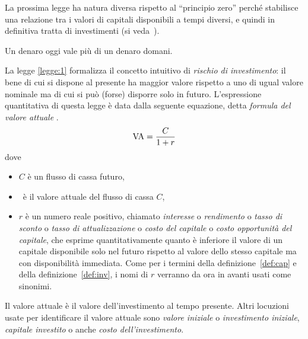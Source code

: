 La prossima legge ha natura diversa rispetto al ``principio zero'' perché stabilisce una relazione tra i valori di capitali
disponibili a tempi diversi, e quindi in definitiva tratta di investimenti (si veda~\cite[§2.1.1 p. 12]{brealey_et_al1999}).

\begin{legge}\label{legge:1}
  Un denaro oggi vale più di un denaro domani.
\end{legge}
La legge \ref{legge:1} formalizza il concetto intuitivo di \emph{rischio di investimento}: il bene di cui si dispone
al presente ha maggior valore rispetto a uno di ugual valore nominale ma di cui si può (forse) disporre solo in futuro.
L'espressione quantitativa di questa legge è data dalla seguente equazione, detta \emph{formula del valore attuale} \VA. 
\begin{equation}
  \label{eq:VA}
  \mathrm{VA}=\frac{C}{1+r}
\end{equation}
dove
\begin{itemize}
\item  $C$ è un flusso di cassa futuro,
\item \VA\ è il valore attuale del flusso di cassa $C$,
\item $r$ è un numero reale positivo, chiamato \emph{interesse} o \emph{rendimento} o \emph{tasso di sconto} o
  \emph{tasso di attualizzazione} o \emph{costo del capitale} o \emph{costo opportunità del capitale}, che esprime
  quantitativamente quanto è inferiore il valore di un capitale disponibile solo nel futuro rispetto al valore dello
  stesso capitale ma con disponibilità immediata. Come per i termini della definizione~\ref{def:cap} e della
  definizione~\eqref{def:inv}, i nomi di $r$ verranno da ora in avanti usati come sinonimi.
\end{itemize}

\begin{oss}\label{oss:va}
  Il valore attuale è il valore dell'investimento al tempo presente. Altri locuzioni usate per identificare il valore attuale
  sono \emph{valore iniziale}  o \emph{investimento iniziale}, \emph{capitale investito} o anche \emph{costo dell'investimento}.
\end{oss}

